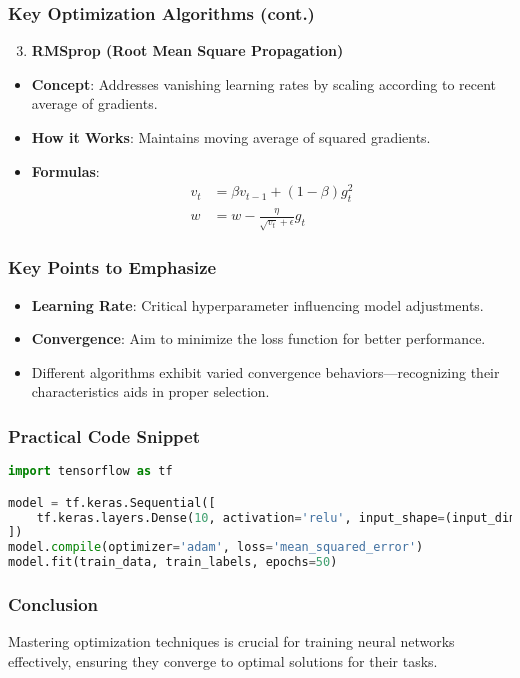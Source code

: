 \documentclass[aspectratio=169]{beamer}
\begin{document}
\begin{frame}[fragile]
    \frametitle{Key Optimization Algorithms (cont.)}
    \begin{enumerate}
        \setcounter{enumi}{2}
        \item \textbf{RMSprop (Root Mean Square Propagation)}
    \end{enumerate}
    \begin{itemize}
        \item \textbf{Concept}: Addresses vanishing learning rates by scaling according to recent average of gradients.
        \item \textbf{How it Works}: Maintains moving average of squared gradients.
        \item \textbf{Formulas}:
        \begin{align}
            v_t & = \beta v_{t-1} + (1 - \beta)g_t^2 \\
            w & = w - \frac{\eta}{\sqrt{v_t} + \epsilon} g_t
        \end{align}
    \end{itemize}
\end{frame}

\begin{frame}[fragile]
    \frametitle{Key Points to Emphasize}
    \begin{itemize}
        \item \textbf{Learning Rate}: Critical hyperparameter influencing model adjustments.
        \item \textbf{Convergence}: Aim to minimize the loss function for better performance.
        \item Different algorithms exhibit varied convergence behaviors—recognizing their characteristics aids in proper selection.
    \end{itemize}
\end{frame}

\begin{frame}[fragile]
    \frametitle{Practical Code Snippet}
    \begin{lstlisting}[language=Python]
import tensorflow as tf

model = tf.keras.Sequential([
    tf.keras.layers.Dense(10, activation='relu', input_shape=(input_dim,))
])
model.compile(optimizer='adam', loss='mean_squared_error')
model.fit(train_data, train_labels, epochs=50)
    \end{lstlisting}
\end{frame}

\begin{frame}[fragile]
    \frametitle{Conclusion}
    Mastering optimization techniques is crucial for training neural networks effectively, ensuring they converge to optimal solutions for their tasks.
\end{frame}
\end{document}
